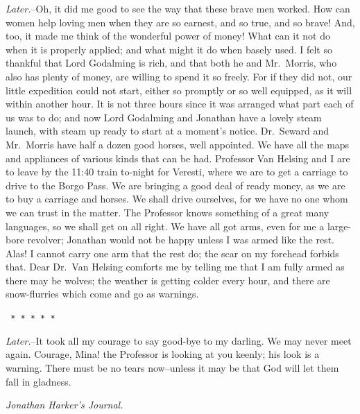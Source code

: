 \documentclass[12pt,openright]{book}
\begin{document}
\textit{Later.}–Oh, it did me good to see the way that these brave men worked. How can women help loving men when they are so earnest, and so true, and so brave! And, too, it made me think of the wonderful power of money! What can it not do when it is properly applied; and what might it do when basely used. I felt so thankful that Lord Godalming is rich, and that both he and Mr. Morris, who also has plenty of money, are willing to spend it so freely. For if they did not, our little expedition could not start, either so promptly or so well equipped, as it will within another hour. It is not three hours since it was arranged what part each of us was to do; and now Lord Godalming and Jonathan have a lovely steam launch, with steam up ready to start at a moment’s notice. Dr. Seward and Mr. Morris have half a dozen good horses, well appointed. We have all the maps and appliances of various kinds that can be had. Professor Van Helsing and I are to leave by the 11:40 train to-night for Veresti, where we are to get a carriage to drive to the Borgo Pass. We are bringing a good deal of ready money, as we are to buy a carriage and horses. We shall drive ourselves, for we have no one whom we can trust in the matter. The Professor knows something of a great many languages, so we shall get on all right. We have all got arms, even for me a large-bore revolver; Jonathan would not be happy unless I was armed like the rest. Alas! I cannot carry one arm that the rest do; the scar on my forehead forbids that. Dear Dr. Van Helsing comforts me by telling me that I am fully armed as there may be wolves; the weather is getting colder every hour, and there are snow-flurries which come and go as warnings.

\texttt{   *       *       *       *       *}

\textit{Later.}–It took all my courage to say good-bye to my darling. We may never meet again. Courage, Mina! the Professor is looking at you keenly; his look is a warning. There must be no tears now–unless it may be that God will let them fall in gladness.

\textit{Jonathan Harker’s Journal.}
\end{document}
